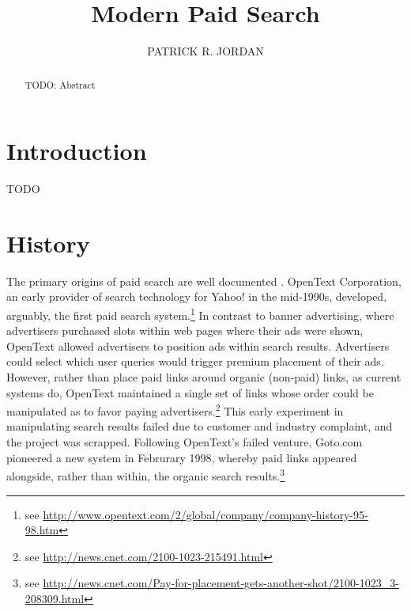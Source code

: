 \documentclass[prodmode,acmtist]{acmsmall} %
\begin{document}

\title{Modern Paid Search}
\author{PATRICK R. JORDAN
}

\begin{abstract}
TODO: Abstract
\end{abstract}





\maketitle

\section{Introduction}

TODO

\section{History} %
\label{sec:history}

The primary origins of paid search are well documented \cite{Jansen:2008uq}.
OpenText Corporation, an early provider of search technology for Yahoo! in the mid-1990s, developed, arguably, the first paid search system.\footnote{see \url{http://www.opentext.com/2/global/company/company-history-95-98.htm}}
In contrast to banner advertising, where advertisers purchased slots within web pages where their ads were shown, OpenText allowed advertisers to position ads within search results.
Advertisers could select which user queries would trigger premium placement of their ads.
However, rather than place paid links around organic (non-paid) links, as current systems do, OpenText maintained a single set of links whose order could be manipulated as to favor paying advertisers.\footnote{see \url{http://news.cnet.com/2100-1023-215491.html}}
This early experiment in manipulating search results failed due to customer and industry complaint, and the project was scrapped. 
Following OpenText's failed venture, Goto.com pioneered a new system in Februrary 1998, whereby paid links appeared alongside, rather than within, the organic search results.\footnote{see \url{http://news.cnet.com/Pay-for-placement-gets-another-shot/2100-1023_3-208309.html}}
\end{document}
